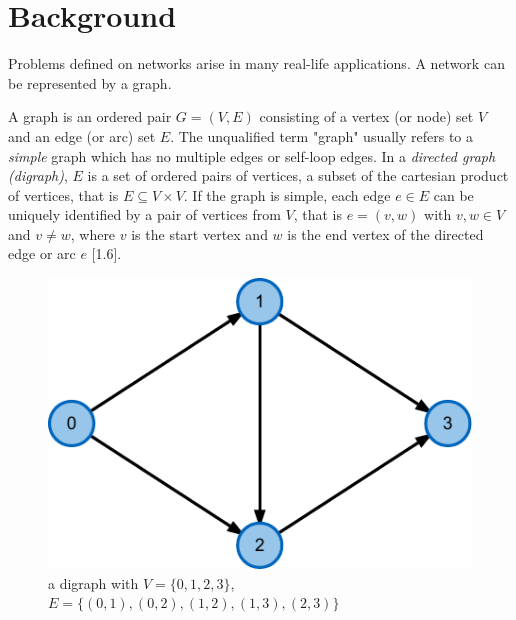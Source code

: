 \chapter{Background}\label{ch:2}
Problems defined on networks arise in many real-life applications. A network can be represented by a graph. 

\newcommand{\Ein}[1]{\delta^-(#1)}
\newcommand{\Eout}[1]{\delta^+(#1)}
\newcommand{\ein}{{e_{\text{in}}}}
\newcommand{\eout}{{e_{\text{out}}}}

\newcommand{\setfont}[1]{#1}

\begin{definition}
A graph is an ordered pair $G = (V, E)$ consisting of a vertex (or node) set $V$ and an edge (or arc) set $E$. The unqualified term "graph" usually refers to a \textit{simple} graph which has no multiple edges or self-loop edges. In a \textit{directed graph (digraph)}, $E$ is a set of ordered pairs of vertices, a subset of the cartesian product of vertices, that is $E \subseteq V \times V$. If the graph is simple, each edge $e \in E$ can be uniquely identified by a pair of vertices from $V$, that is $e=(v,w)$ with $v,w \in V$ and $v \neq w$, where $v$ is the start vertex and $w$ is the end vertex of the directed edge or arc $e$ \cite{jungnickel2013graphs}[1.6]. \end{definition}

\begin{figure}
\centering
	\includegraphics{fig/graph-editor}
	\caption{a digraph with $V=\{0,1,2,3\}$, $E=\{(0,1),(0,2),(1,2),(1,3),(2,3)\}$}
	\label{fig:graph}
\end{figure}

